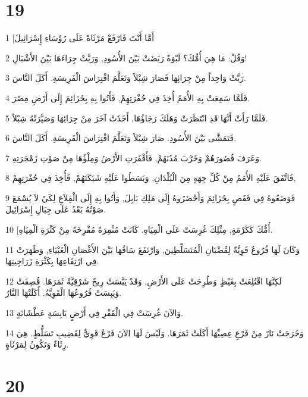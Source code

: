 \chapter{19}

\par 1 [أَمَّا أَنْتَ فَارْفَعْ مَرْثَاةً عَلَى رُؤَسَاءِ إِسْرَائِيلَ
\par 2 وَقُلْ: مَا هِيَ أُمُّكَ؟ لَبْوَةٌ رَبَضَتْ بَيْنَ الأُسُودِ, وَرَبَّتْ جِرَاءَهَا بَيْنَ الأَشْبَالِ!
\par 3 رَبَّتْ وَاحِداً مِنْ جِرَائِهَا فَصَارَ شِبْلاً وَتَعَلَّمَ افْتِرَاسَ الْفَرِيسَةِ. أَكَلَ النَّاسَ.
\par 4 فَلَمَّا سَمِعَتْ بِهِ الأُمَمُ أُخِذَ فِي حُفْرَتِهِمْ, فَأَتُوا بِهِ بِخَزَائِمَ إِلَى أَرْضِ مِصْرَ.
\par 5 فَلَمَّا رَأَتْ أَنَّهَا قَدِ انْتَظَرَتْ وَهَلَكَ رَجَاؤُهَا, أَخَذَتْ آخَرَ مِنْ جِرَائِهَا وَصَيَّرَتْهُ شِبْلاً.
\par 6 فَتَمَشَّى بَيْنَ الأُسُودِ. صَارَ شِبْلاً وَتَعَلَّمَ افْتِرَاسَ الْفَرِيسَةِ. أَكَلَ النَّاسَ.
\par 7 وَعَرَفَ قُصُورَهُمْ وَخَرَّبَ مُدُنَهُمْ, فَأَقْفَرَتِ الأَرْضُ وَمِلْؤُهَا مِنْ صَوْتِ زَمْجَرَتِهِ.
\par 8 فَاتَّفَقَ عَلَيْهِ الأُمَمُ مِنْ كُلِّ جِهَةٍ مِنَ الْبُلْدَانِ, وَبَسَطُوا عَلَيْهِ شَبَكَتَهُمْ, فَأُخِذَ فِي حُفْرَتِهِمْ,
\par 9 فَوَضَعُوهُ فِي قَفَصٍ بِخَزَائِمَ وَأَحْضَرُوهُ إِلَى مَلِكِ بَابِلَ, وَأَتُوا بِهِ إِلَى الْقِلاَعِ لِكَيْ لاَ يُسْمَعَ صَوْتُهُ بَعْدُ عَلَى جِبَالِ إِسْرَائِيلَ.
\par 10 [أُمُّكَ كَكَرْمَةٍ, مِثْلِكَ غُرِسَتْ عَلَى الْمِيَاهِ. كَانَتْ مُثْمِرَةً مُفْرِخَةً مِنْ كَثْرَةِ الْمِيَاهِ.
\par 11 وَكَانَ لَهَا فُرُوعٌ قَوِيَّةٌ لِقُضْبَانِ الْمُتَسَلِّطِينَ, وَارْتَفَعَ سَاقُهَا بَيْنَ الأَغْصَانِ الْغَبْيَاءِ, وَظَهَرَتْ فِي ارْتِفَاعِهَا بِكَثْرَةِ زَرَاجِينِهَا.
\par 12 لَكِنَّهَا اقْتُلِعَتْ بِغَيْظٍ وَطُرِحَتْ عَلَى الأَرْضِ, وَقَدْ يَبَّسَتْ رِيحٌ شَرْقِيَّةٌ ثَمَرَهَا. قُصِفَتْ وَيَبِسَتْ فُرُوعُهَا الْقَوِيَّةُ. أَكَلَتْهَا النَّارُ.
\par 13 وَالآنَ غُرِسَتْ فِي الْقَفْرِ فِي أَرْضٍ يَابِسَةٍ عَطْشَانَةٍ.
\par 14 وَخَرَجَتْ نَارٌ مِنْ فَرْعِ عِصِيِّهَا أَكَلَتْ ثَمَرَهَا. وَلَيْسَ لَهَا الآنَ فَرْعٌ قَوِيٌّ لِقَضِيبِ تَسَلُّطٍ. هِيَ رِثَاءٌ وَتَكُونُ لِمَرْثَاةٍ.

\chapter{20}

